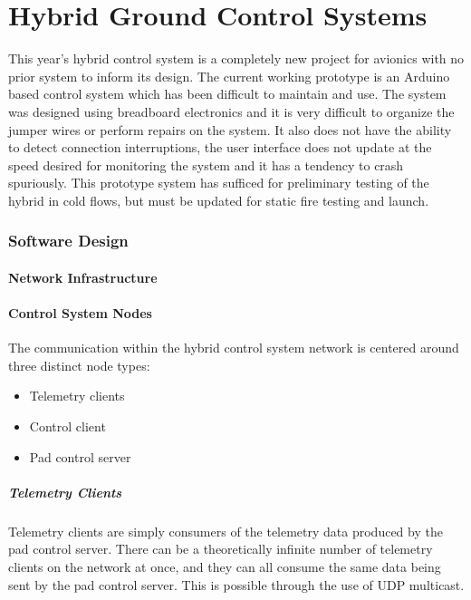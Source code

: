 \part{Hybrid Ground Control Systems}

This year's hybrid control system is a completely new project for avionics with no prior system to inform its design. The current working prototype is an Arduino based control system which has been difficult to maintain and use. The system was designed using breadboard electronics and it is very difficult to organize the jumper wires or perform repairs on the system. It also does not have the ability to detect connection interruptions, the user interface does not update at the speed desired for monitoring the system and it has a tendency to crash spuriously. This prototype system has sufficed for preliminary testing of the hybrid in cold flows, but must be updated for static fire testing and
launch.


\section{Software Design}

\subsection{Network Infrastructure}

\subsection{Control System Nodes}

The communication within the hybrid control system network is centered around three distinct node types:

\begin{itemize}
    \item Telemetry clients
    \item Control client
    \item Pad control server
\end{itemize}

\subsubsection{Telemetry Clients}

Telemetry clients are simply consumers of the telemetry data produced by the pad control server. There can be a theoretically infinite number of telemetry clients on the network at once, and they can all consume the same data being sent by the pad control server. This is possible through the use of UDP multicast.

